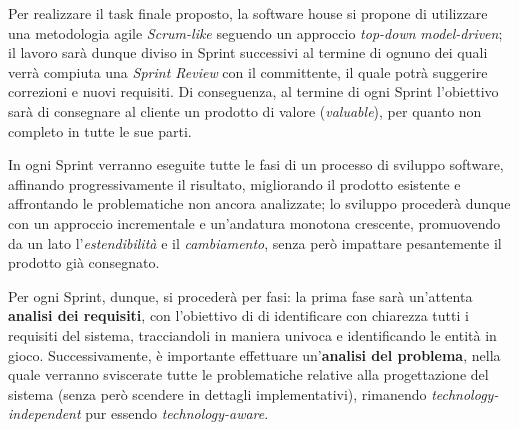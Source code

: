 Per realizzare il task finale proposto, la software house si propone di utilizzare una metodologia agile \textit{Scrum-like}
seguendo un approccio \textit{top-down} \textit{model-driven};
il lavoro sarà dunque diviso in Sprint successivi al termine di ognuno dei quali verrà compiuta una \textit{Sprint Review}
con il committente, il quale potrà suggerire correzioni e nuovi requisiti.
Di conseguenza, al termine di ogni Sprint l'obiettivo sarà di consegnare al cliente un prodotto di valore (\textit{valuable}),
per quanto non completo in tutte le sue parti.

In ogni Sprint verranno eseguite tutte le fasi di un processo di sviluppo software, affinando progressivamente il risultato,
migliorando il prodotto esistente e affrontando le problematiche non ancora analizzate;
lo sviluppo procederà dunque con un approccio incrementale e un'andatura monotona crescente, promuovendo da un lato
l'\textit{estendibilità} e il \textit{cambiamento}, senza però impattare pesantemente il prodotto già consegnato.

Per ogni Sprint, dunque, si procederà per fasi:
la prima fase sarà un'attenta \textbf{analisi dei requisiti}, con l'obiettivo di di identificare con chiarezza
tutti i requisiti del sistema, tracciandoli in maniera univoca e identificando le entità in gioco.
Successivamente, è importante effettuare un'\textbf{analisi del problema}, nella quale verranno sviscerate tutte le problematiche
relative alla progettazione del sistema (senza però scendere in dettagli implementativi),
rimanendo \textit{technology-independent} pur essendo \textit{technology-aware}.
